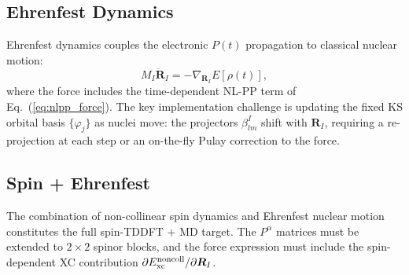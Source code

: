 \documentclass[12pt,letterpaper]{article}
\begin{document}
\subsection{Ehrenfest Dynamics}

Ehrenfest dynamics couples the electronic $P(t)$ propagation to classical
nuclear motion:
\begin{equation}
  M_I\ddot{\bm{R}}_I = -\nabla_{\bm{R}_I} E[\rho(t)],
\end{equation}
where the force includes the time-dependent NL-PP term of
Eq.~(\ref{eq:nlpp_force}).  The key implementation challenge is updating the
fixed KS orbital basis $\{\varphi_j\}$ as nuclei move: the projectors $\beta^I_{lm}$
shift with $\bm{R}_I$, requiring a re-projection at each step or an on-the-fly
Pulay correction to the force.

\subsection{Spin + Ehrenfest}

The combination of non-collinear spin dynamics and Ehrenfest nuclear motion
constitutes the full spin-TDDFT + MD target.  The $P^\alpha$ matrices must
be extended to $2\times2$ spinor blocks, and the force expression must include
the spin-dependent XC contribution $\partial E_{\rm xc}^{\rm noncoll}/\partial\bm{R}_I$.



\end{document}
